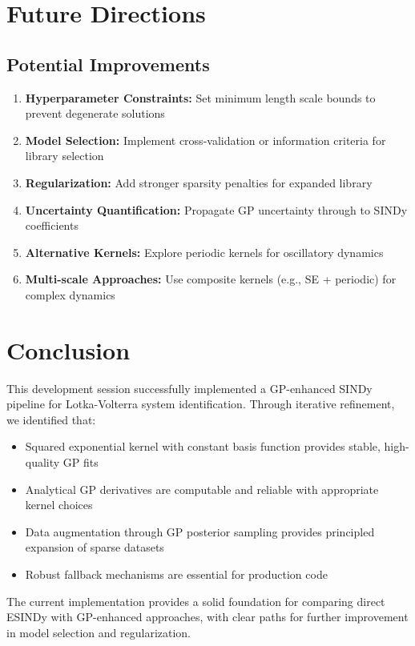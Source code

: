 \documentclass[11pt]{article}
\begin{document}
\section{Future Directions}

\subsection{Potential Improvements}

\begin{enumerate}
    \item \textbf{Hyperparameter Constraints:} Set minimum length scale bounds to prevent degenerate solutions
    \item \textbf{Model Selection:} Implement cross-validation or information criteria for library selection
    \item \textbf{Regularization:} Add stronger sparsity penalties for expanded library
    \item \textbf{Uncertainty Quantification:} Propagate GP uncertainty through to SINDy coefficients
    \item \textbf{Alternative Kernels:} Explore periodic kernels for oscillatory dynamics
    \item \textbf{Multi-scale Approaches:} Use composite kernels (e.g., SE + periodic) for complex dynamics
\end{enumerate}

\section{Conclusion}

This development session successfully implemented a GP-enhanced SINDy pipeline for Lotka-Volterra system identification. Through iterative refinement, we identified that:

\begin{itemize}
    \item Squared exponential kernel with constant basis function provides stable, high-quality GP fits
    \item Analytical GP derivatives are computable and reliable with appropriate kernel choices
    \item Data augmentation through GP posterior sampling provides principled expansion of sparse datasets
    \item Robust fallback mechanisms are essential for production code
\end{itemize}

The current implementation provides a solid foundation for comparing direct ESINDy with GP-enhanced approaches, with clear paths for further improvement in model selection and regularization.
\end{document}
